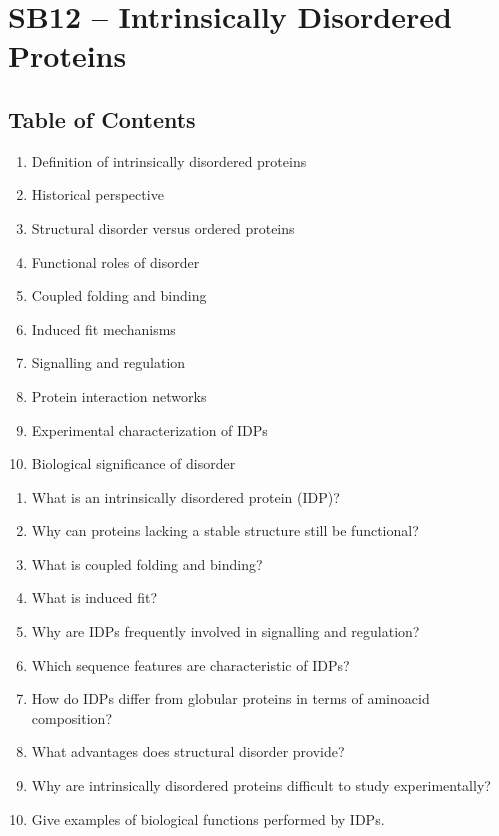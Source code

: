\section{SB12 -- Intrinsically Disordered Proteins}

\subsection*{Table of Contents}

\begin{enumerate}
\item Definition of intrinsically disordered proteins
\item Historical perspective
\item Structural disorder versus ordered proteins
\item Functional roles of disorder
\item Coupled folding and binding
\item Induced fit mechanisms
\item Signalling and regulation
\item Protein interaction networks
\item Experimental characterization of IDPs
\item Biological significance of disorder
\end{enumerate}


\begin{enumerate}
\item{What is an intrinsically disordered protein (IDP)?}
\item{Why can proteins lacking a stable structure still be functional?}
\item{What is coupled folding and binding?}
\item{What is induced fit?}
\item{Why are IDPs frequently involved in signalling and regulation?}
\item{Which sequence features are characteristic of IDPs?}
\item{How do IDPs differ from globular proteins in terms of aminoacid composition?}
\item{What advantages does structural disorder provide?}
\item{Why are intrinsically disordered proteins difficult to study experimentally?}
\item{Give examples of biological functions performed by IDPs.}
\end{enumerate}
